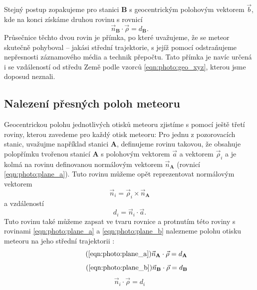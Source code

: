 \smallskip

Stejný postup zopakujeme pro stanici \textbf{B} s geocentrickým polohovým vektorem $\vec{b}$, kde na konci získáme druhou rovinu s rovnicí
\begin{equation}
    \vec{n}_\mathbf{B}\cdot \vec{\rho}=d_\mathbf{B}\text{.}
    \label{eqn:photo:plane_b}
\end{equation}
Průsečnice těchto dvou rovin je přímka, po které uvažujeme, že se meteor skutečně pohyboval -- jakási střední trajektorie, s jejíž pomocí odstraňujeme nepřesnosti záznamového média a technik přepočtu. Tato přímka je navíc určená i se vzdáleností od středu Země podle vzorců \eqref{eqn:photo:geo_xyz}, kterou jsme doposud neznali.

\subsection{Nalezení přesných poloh meteoru}%
Geocentrickou polohu jednotlivých otisků meteoru zjistíme s pomocí ještě třetí roviny, kterou zavedeme pro každý otisk meteoru: Pro jednu z pozorovacích stanic, uvažujme například stanici \textbf{A}, definujeme rovinu takovou, že obsahuje polopřímku tvořenou stanicí \textbf{A} s polohovým vektorem $\vec{a}$ a vektorem $\vec{\rho}_i$ a je kolmá na rovinu definovanou normálovým vektorem $\vec{n}_\mathbf{A}$ (rovnicí \eqref{eqn:photo:plane_a}). Tuto rovinu můžeme opět reprezentovat normálovým vektorem \cite{ceplecha}
\begin{equation}
    \vec{n}_i=\vec{\rho}_i\times\vec{n}_\mathbf{A}
\end{equation}
a vzdáleností
\begin{equation}
    d_i=\vec{n}_i\cdot \vec{a}\text{.}
\end{equation}
Tuto rovinu také můžeme zapsat ve tvaru rovnice a protnutím této roviny s rovinami \eqref{eqn:photo:plane_a} a \eqref{eqn:photo:plane_b} nalezneme polohu otisku meteoru na jeho střední trajektorii \cite{ceplecha}:
\begin{equation}
    \tag{\ref{eqn:photo:plane_a}}
    \vec{n}_\mathbf{A}\cdot\vec{\rho}=d_\mathbf{A}
\end{equation}
\begin{equation}
    \tag{\ref{eqn:photo:plane_b}}
    \vec{n}_\mathbf{B}\cdot\vec{\rho}=d_\mathbf{B}
\end{equation}
\begin{equation}
    \vec{n}_i\cdot\vec{\rho}=d_i
\end{equation}

